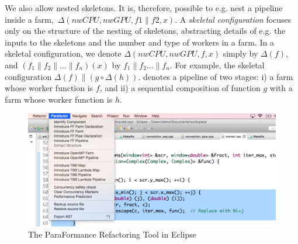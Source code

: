 \documentclass[smallextended]{svjour3}
\begin{document}
We also allow nested skeletons. It is, therefore, possible to e.g. nest a
pipeline inside a farm,\ $\Delta(nwCPU,nwGPU,f1 \parallel f2, x)$.
%
A \emph{skeletal configuration}  focuses only on the structure of the nesting of
skeletons, abstracting details
of e.g. the inputs to the skeletons and the number and type of workers
in a farm. In a skeletal configuration, we denote
$\Delta(\mathit{nwCPU},\mathit{nwGPU},f,x)$ simply by $\Delta(f)$, and $(f_1 \parallel
f_2 \parallel \dots \parallel f_n)(x)$ by $f_1 \parallel f_2
\dots \parallel f_n$. For example, the skeletal
configuration $\Delta(f) \parallel ( g \circ \Delta(h))$.
denotes a
pipeline of two stages: %
i) a farm whose worker function is $f$, and ii) a sequential composition of
function $g$ with a farm whose worker function is $h$. %


\begin{figure}[t]
\begin{center}
\includegraphics[width=0.95\linewidth]{figures/parformance.png}
\caption{The ParaFormance Refactoring Tool in Eclipse}
\label{eclipse}
\end{center}
\end{figure}
\end{document}
